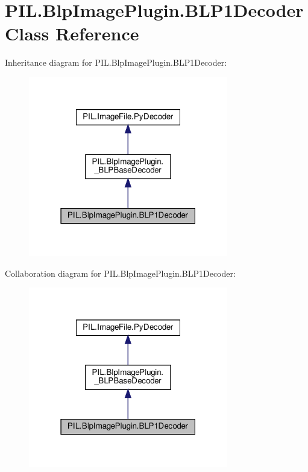\hypertarget{classPIL_1_1BlpImagePlugin_1_1BLP1Decoder}{}\section{P\+I\+L.\+Blp\+Image\+Plugin.\+B\+L\+P1\+Decoder Class Reference}
\label{classPIL_1_1BlpImagePlugin_1_1BLP1Decoder}


Inheritance diagram for P\+I\+L.\+Blp\+Image\+Plugin.\+B\+L\+P1\+Decoder\+:
\nopagebreak
\begin{figure}[H]
\begin{center}
\leavevmode
\includegraphics[width=247pt]{classPIL_1_1BlpImagePlugin_1_1BLP1Decoder__inherit__graph}
\end{center}
\end{figure}


Collaboration diagram for P\+I\+L.\+Blp\+Image\+Plugin.\+B\+L\+P1\+Decoder\+:
\nopagebreak
\begin{figure}[H]
\begin{center}
\leavevmode
\includegraphics[width=247pt]{classPIL_1_1BlpImagePlugin_1_1BLP1Decoder__coll__graph}
\end{center}
\end{figure}
